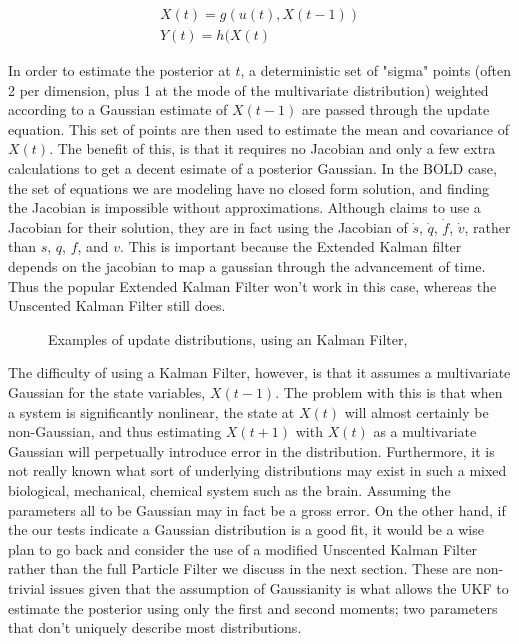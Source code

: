 \documentclass{article}
\begin{document}
\begin{eqnarray}
X(t) = g(u(t), X(t-1))\\
Y(t) = h(X(t)
\end{eqnarray}

In order to estimate the posterior at $t$, a deterministic set of "sigma" points 
(often 2 per dimension, plus 1 at the mode of the multivariate distribution)
weighted according to a Gaussian estimate of $X(t-1)$ are passed through
the update equation. This set of points are then used to estimate the 
mean and covariance of $X(t)$. The benefit of this, is that it requires
no Jacobian and only a few extra calculations to get a decent esimate of
a posterior Gaussian. In the BOLD case, the set of equations we are modeling have no 
closed form solution, and finding the Jacobian is impossible without approximations. Although 
\cite{Riera2004} claims to use a Jacobian for their solution, they are
in fact using the Jacobian of $\dot{s}$, $\dot{q}$, $\dot{f}$, $\dot{v}$,
rather than $s$, $q$, $f$, and $v$. This is important because the Extended
Kalman filter depends on the jacobian to map a gaussian through the 
advancement of time. Thus the popular Extended Kalman Filter won't work
in this case, whereas the Unscented Kalman Filter still does.

\begin{figure}
\label{fig:EKFWorking}
\caption{Examples of update distributions, using an Kalman Filter, \cite{Thrun}}
\end{figure}

The difficulty
of using a Kalman Filter, however, is that it assumes a multivariate 
Gaussian for the state variables, $X(t-1)$. The problem with this is that 
when a system is significantly nonlinear, the state at 
$X(t)$ will almost certainly be non-Gaussian, and thus estimating
$X(t+1)$ with $X(t)$ as a multivariate Gaussian will perpetually introduce
error in the distribution. Furthermore, it is not really known what 
sort of underlying distributions may exist in such a mixed biological,
mechanical, chemical system such as the brain. Assuming the parameters
all to be Gaussian may in fact be a gross error. On the other hand, if
the our tests indicate a Gaussian distribution is a good fit, it would
be a wise plan to go back and consider the use of a modified Unscented 
Kalman Filter rather
than the full Particle Filter we discuss in the next section. These are 
non-trivial issues given that the assumption of Gaussianity is what allows
the UKF to estimate the posterior using only the first and second moments;
two parameters that don't uniquely describe most distributions.
\end{document}

